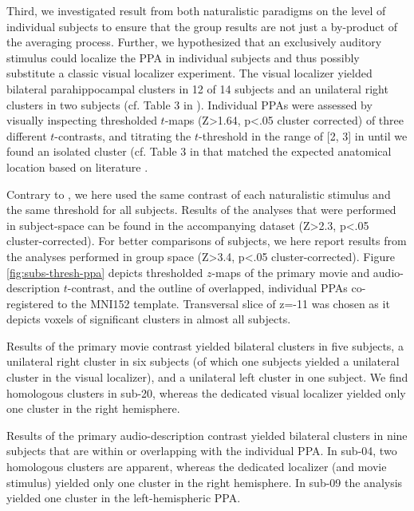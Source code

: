 \documentclass[english]{article}
\begin{document}
Third, we investigated result from both naturalistic paradigms on the level of
individual subjects to ensure that the group results are not just a by-product
of the averaging process.
Further, we hypothesized that an exclusively auditory stimulus could localize
the PPA in individual subjects and thus possibly substitute a classic visual
localizer experiment.
The visual localizer yielded bilateral parahippocampal clusters in 12 of 14
subjects and an unilateral right clusters in two subjects (cf. Table 3 in
\citep{sengupta2016extension}).
Individual PPAs were assessed by visually inspecting thresholded $t$-maps
(Z>1.64, p<.05 cluster corrected) of three different $t$-contrasts, and
titrating the $t$-threshold in the range of [2, 3] in until we found an
isolated cluster (cf. Table 3 in that matched the expected anatomical location
based on literature \citep{epstein1998ppa}.

Contrary to \citep{sengupta2016extension}, we here used the same contrast of
each naturalistic stimulus and the same threshold for all subjects.
Results of the analyses that were performed in subject-space can be found in the
accompanying dataset (Z>2.3, p<.05 cluster-corrected).
For better comparisons of subjects, we here report results from the analyses
performed in group space (Z>3.4, p<.05 cluster-corrected).
Figure \ref{fig:subs-thresh-ppa} depicts thresholded $z$-maps of the primary movie
and audio-description $t$-contrast, and the outline of overlapped, individual PPAs
co-registered to the MNI152 template.
Transversal slice of z=-11 was chosen as it depicts voxels of
significant clusters in almost all subjects.

Results of the primary movie contrast yielded bilateral clusters in five subjects,
a unilateral right cluster in six subjects (of which one subjects yielded a
unilateral cluster in the visual localizer), and a unilateral left cluster in
one subject.
We find homologous clusters in sub-20, whereas the dedicated visual localizer
yielded only one cluster in the right hemisphere.

Results of the primary audio-description contrast yielded bilateral clusters in nine subjects
that are within or overlapping with the individual PPA.
In sub-04, two homologous clusters are apparent, whereas the dedicated localizer
(and movie stimulus) yielded only one cluster in the right hemisphere.
In sub-09 the analysis yielded one cluster in the left-hemispheric PPA.
\end{document}

